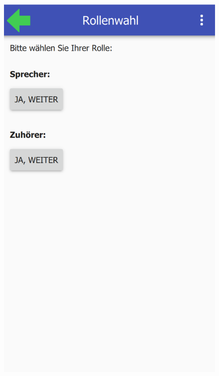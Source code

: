 \begin{figure}[ht!]
	\centering
	\begin{minipage}{0.31\linewidth}
		\centering
		\includegraphics[scale=0.5]{GUI/Bilder/2_Rollenwahl.PNG}
	\end{minipage}
	\begin{minipage}{0.31\linewidth}
		\centering

\end{minipage}
\end{figure}
